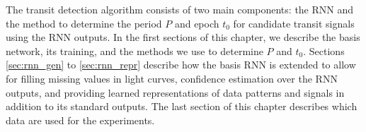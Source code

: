 
The transit detection algorithm consists of two main components: the RNN and the method to determine the period $P$ and epoch $t_0$ for candidate transit signals using the RNN outputs. In the first sections of this chapter, we describe the basis network, its training, and the methods we use to determine $P$ and $t_0$. Sections \ref{sec:rnn_gen} to \ref{sec:rnn_repr} describe how the basis RNN is extended to allow for filling missing values in light curves, confidence estimation over the RNN outputs, and providing learned representations of data patterns and signals in addition to its standard outputs. The last section of this chapter describes which data are used for the experiments.